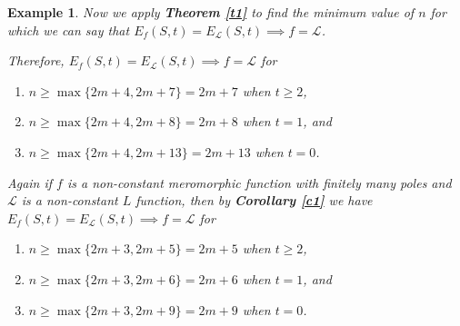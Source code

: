 \documentclass[a4paper,draft]{amsproc}
\theoremstyle{plain}
\newtheorem{exm}{Example}[section]
\theoremstyle{definition}
\theoremstyle{remark}
\numberwithin{equation}{section}
\begin{document}
\begin{exm}
	Now we apply {\em\bf Theorem \ref{t1}} to find the minimum value of $n$ for which we can say that  $E_f(S, t)=E_\mathcal{L}(S,t)\implies f=\mathcal{L}$.
	
	Therefore,  $E_f(S, t)=E_\mathcal{L}(S,t)\implies f=\mathcal{L}$ for  
	\begin{enumerate}
		\item $n \geq \max\{ 2m+4,2m+7\}=2m+7$ when $t\geq 2 $,
		\item  $n \geq \max\{ 2m+4,2m+8\}=2m+8$ when $t=1 $, and
		\item  $n \geq \max\{ 2m+4,2m+13\}=2m+13$ when $t=0 $.
	\end{enumerate}
	
	Again if $f$ is a non-constant meromorphic function with finitely many poles and $\mathcal{L}$ is a non-constant $L$ function, then by {\em\bf Corollary \ref{c1}} we have $E_f(S, t)=E_\mathcal{L}(S,t)\implies f=\mathcal{L}$ for  
	\begin{enumerate}
		\item $n \geq \max\{ 2m+3,2m+5\}=2m+5$ when $t\geq 2 $,
		\item  $n \geq \max\{ 2m+3,2m+6\}=2m+6$ when $t=1 $, and
		\item  $n \geq \max\{ 2m+3,2m+9\}=2m+9$ when $t=0 $.
	\end{enumerate} 
\end{exm}
\end{document}
